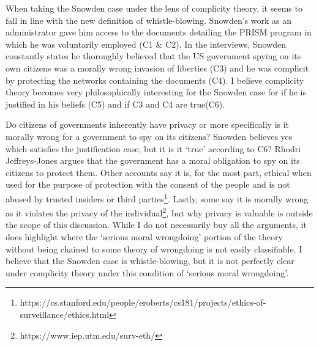 \documentclass[12pt]{article}
\begin{document}
When taking the Snowden case under the lens of complicity theory, it seems to
fall in line with the new definition of whistle-blowing. Snowden's work as an
administrator gave him access to the documents detailing the PRISM program in
which he was voluntarily employed (C1 \& C2). In the interviews, Snowden
constantly states he thoroughly believed that the US government spying on its
own citizens was a morally wrong invasion of liberties (C3) and he was complicit
by protecting the networks containing the documents (C4). I believe complicity
theory becomes very philosophically interesting for the Snowden case for if he
is justified in his beliefs (C5) and if C3 and C4 are true(C6).

Do citizens of governments inherently have privacy or more specifically is it
morally wrong for a government to spy on its citizens? Snowden believes yes
which satisfies the justification case, but it is it `true' according to C6?
Rhodri Jeffreys-Jones argues that the government has a moral obligation to spy
on its citizens to protect them. Other accounts say it is, for the most part,
ethical when used for the purpose of protection with the consent of the people
and is not abused by trusted insiders or third
parties\footnote{https://cs.stanford.edu/people/eroberts/cs181/projects/ethics-of-surveillance/ethics.html}.
Lastly, some say it is morally wrong as it violates the privacy of the
individual\footnote{https://www.iep.utm.edu/surv-eth/}, but why privacy is
valuable is outside the scope of this discussion. While I do not necessarily buy
all the arguments, it does highlight where the `serious moral wrongdoing'
portion of the theory without being chained to some theory of wrongdoing is not
easily classifiable. I believe that the Snowden case is whistle-blowing, but it
is not perfectly clear under complicity theory under this condition of `serious
moral wrongdoing'.
\end{document}

